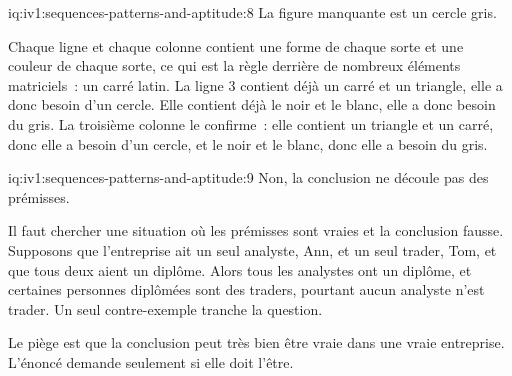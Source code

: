 \begin{solution}{iq:iv1:sequences-patterns-and-aptitude:8}
La figure manquante est un cercle gris.

Chaque ligne et chaque colonne contient une forme de chaque sorte et une couleur de chaque sorte, ce qui est la règle derrière de nombreux éléments matriciels~: un carré latin. La ligne 3 contient déjà un carré et un triangle, elle a donc besoin d'un cercle. Elle contient déjà le noir et le blanc, elle a donc besoin du gris. La troisième colonne le confirme~: elle contient un triangle et un carré, donc elle a besoin d'un cercle, et le noir et le blanc, donc elle a besoin du gris.

\end{solution}

\begin{solution}{iq:iv1:sequences-patterns-and-aptitude:9}
Non, la conclusion ne découle pas des prémisses.

Il faut chercher une situation où les prémisses sont vraies et la conclusion fausse. Supposons que l'entreprise ait un seul analyste, Ann, et un seul trader, Tom, et que tous deux aient un diplôme. Alors tous les analystes ont un diplôme, et certaines personnes diplômées sont des traders, pourtant aucun analyste n'est trader. Un seul contre-exemple tranche la question.

Le piège est que la conclusion peut très bien être vraie dans une vraie entreprise. L'énoncé demande seulement si elle doit l'être.

\end{solution}

